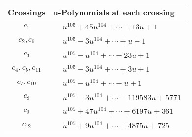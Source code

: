 \documentclass[1p]{elsarticle_modified}
\theoremstyle{definition}
\begin{document}
\begin{tabular}{m{50pt}|m{274pt}}
Crossings & \hspace{64pt}u-Polynomials at each crossing \\
\hline $$\begin{aligned}c_{1}\end{aligned}$$&$\begin{aligned}
&u^{105}+45 u^{104}+\cdots+13 u+1
\end{aligned}$\\
\hline $$\begin{aligned}c_{2},c_{6}\end{aligned}$$&$\begin{aligned}
&u^{105}-3 u^{104}+\cdots+u+1
\end{aligned}$\\
\hline $$\begin{aligned}c_{3}\end{aligned}$$&$\begin{aligned}
&u^{105}- u^{104}+\cdots-23 u+1
\end{aligned}$\\
\hline $$\begin{aligned}c_{4},c_{5},c_{11}\end{aligned}$$&$\begin{aligned}
&u^{105}-3 u^{104}+\cdots+3 u+1
\end{aligned}$\\
\hline $$\begin{aligned}c_{7},c_{10}\end{aligned}$$&$\begin{aligned}
&u^{105}- u^{104}+\cdots- u+1
\end{aligned}$\\
\hline $$\begin{aligned}c_{8}\end{aligned}$$&$\begin{aligned}
&u^{105}-3 u^{104}+\cdots-119583 u+5771
\end{aligned}$\\
\hline $$\begin{aligned}c_{9}\end{aligned}$$&$\begin{aligned}
&u^{105}+47 u^{104}+\cdots+6197 u+361
\end{aligned}$\\
\hline $$\begin{aligned}c_{12}\end{aligned}$$&$\begin{aligned}
&u^{105}+9 u^{104}+\cdots+4875 u+725
\end{aligned}$\\
\hline
\end{tabular}\newpage\renewcommand{\arraystretch}{1}
\end{document}
